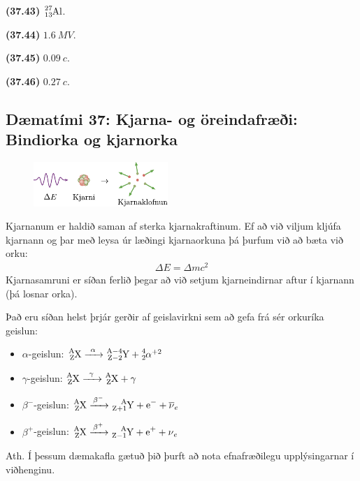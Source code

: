 \ifdefined \wholebook \else\documentclass[oneside]{book}\usepackage{EdlBook}\graphicspath{{figures/}}
\begin{document}
\begin{tcolorbox}
\begin{enumerate*}[label = ]
  \item \textbf{(37.43)} $\ce{^{27}_{13}Al}$.
  \item \textbf{(37.44)} $\SI{1.6}{MV}$.
  \item \textbf{(37.45)} $\SI{0.09}{}c$.
  \item \textbf{(37.46)} $\SI{0.27}{}c$.
\end{enumerate*}
\end{tcolorbox}

\newpage

\subsection*{Dæmatími 37: Kjarna- og öreindafræði: Bindiorka og kjarnorka}

\begin{tcolorbox}
\begin{minipage}{\linewidth}
\begin{figure}
\vspace{-0.5cm}
\includegraphics[width = 2in]{figures/kjarnaklofnun.pdf}
\end{figure}

Kjarnanum er haldið saman af sterka kjarnakraftinum. Ef að við viljum kljúfa kjarnann og þar með leysa úr læðingi kjarnaorkuna þá þurfum við að bæta við orku:
\begin{align*}
    \Delta E = \Delta m c^2
\end{align*}
Kjarnasamruni er síðan ferlið þegar að við setjum kjarneindirnar aftur í kjarnann (þá losnar orka). \\
\end{minipage}
Það eru síðan helst þrjár gerðir af geislavirkni sem að gefa frá sér orkuríka geislun:
\begin{multicols}{2}
\begin{itemize}
    \item $\alpha$-geislun: $\ce{^{A}_{Z}X ->[\alpha] ^{A-4}_{Z-2}Y + ^{4}_{2}\alpha}^{+2}$
    \item $\gamma$-geislun: $\ce{^{A}_{Z}X ->[\gamma] ^{A}_{Z}X + \gamma}$
    \item $\beta^{-}$-geislun: $\ce{^{A}_{Z}X ->[\beta^-] ^{A}_{Z+1}Y + e^{-} + \overline{\nu}_e}$
    \item $\beta^{+}$-geislun: $\ce{^{A}_{Z}X ->[\beta^+] ^{A}_{Z-1}Y + e^{+} + \nu_e}$
\end{itemize}
\end{multicols}
Ath. Í þessum dæmakafla gætuð þið þurft að nota efnafræðilegu upplýsingarnar í viðhenginu.
\end{tcolorbox}
\end{document}
